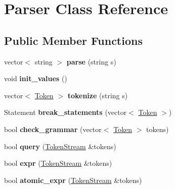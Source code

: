 \hypertarget{class_parser}{\section{Parser Class Reference}
\label{class_parser}
}
\subsection*{Public Member Functions}
\begin{DoxyCompactItemize}
\item 
\hypertarget{class_parser_a6c061189bf198a9ff82c850059bc6a07}{vector$<$ string $>$ {\bfseries parse} (string s)}\label{class_parser_a6c061189bf198a9ff82c850059bc6a07}

\item 
\hypertarget{class_parser_ac96b9afc820eaef9a480f4048c6a8828}{void {\bfseries init\-\_\-values} ()}\label{class_parser_ac96b9afc820eaef9a480f4048c6a8828}

\item 
\hypertarget{class_parser_aacfcfb3cafc88f6389eb0f8bc09a2d0d}{vector$<$ \hyperlink{struct_token}{Token} $>$ {\bfseries tokenize} (string s)}\label{class_parser_aacfcfb3cafc88f6389eb0f8bc09a2d0d}

\item 
\hypertarget{class_parser_a9c573337bd17fd450e5dedbf776c4171}{Statement {\bfseries break\-\_\-statements} (vector$<$ \hyperlink{struct_token}{Token} $>$)}\label{class_parser_a9c573337bd17fd450e5dedbf776c4171}

\item 
\hypertarget{class_parser_a65ff44533bc25f4d3f4f7365fa776fa1}{bool {\bfseries check\-\_\-grammar} (vector$<$ \hyperlink{struct_token}{Token} $>$ tokens)}\label{class_parser_a65ff44533bc25f4d3f4f7365fa776fa1}

\item 
\hypertarget{class_parser_a0c65f050142923184cb56372614f5221}{bool {\bfseries query} (\hyperlink{class_token_stream}{Token\-Stream} \&tokens)}\label{class_parser_a0c65f050142923184cb56372614f5221}

\item 
\hypertarget{class_parser_a0eb3710e8ddf53bf91ef1341338802fa}{bool {\bfseries expr} (\hyperlink{class_token_stream}{Token\-Stream} \&tokens)}\label{class_parser_a0eb3710e8ddf53bf91ef1341338802fa}

\item 
\hypertarget{class_parser_a1dd01c414355cc51537fd5a019d1957e}{bool {\bfseries atomic\-\_\-expr} (\hyperlink{class_token_stream}{Token\-Stream} \&tokens)}\label{class_parser_a1dd01c414355cc51537fd5a019d1957e}


\end{DoxyCompactItemize}
